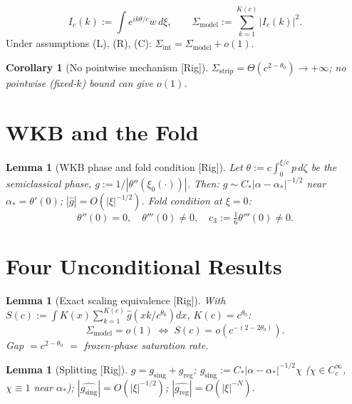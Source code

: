 \documentclass[12pt,a4paper]{amsart}
\newtheorem{lemma}[theorem]{Lemma}
\newtheorem{corollary}[theorem]{Corollary}
\theoremstyle{definition}
\theoremstyle{remark}
\newcommand{\gsing}{g_{\mathrm{sing}}}
\newcommand{\greg}{g_{\mathrm{reg}}}
\newcommand{\Rig}{\textup{[Rig]}}
\begin{document}
\begin{equation}\label{eq:model-def}
  I_c(k):=\int e^{ik\theta/c}
  w\,d\xi,
  \qquad
  \Sigma_{\mathrm{model}}
  :=\textstyle\sum_{k=1}^{K(c)}
  |I_c(k)|^2.
\end{equation}
Under assumptions (L), (R), (C):
$\Sigma_{\mathrm{int}}
=\Sigma_{\mathrm{model}}+o(1)$.

\begin{corollary}[No pointwise
  mechanism \Rig]
\label{cor:S3-negative}
$\Sigma_{\mathrm{strip}}
=\Theta(c^{2-\theta_0})\to+\infty$;
no pointwise (fixed-$k$) bound
can give $o(1)$.
\end{corollary}

\section{WKB and the Fold}
\label{sec:WKB}

\begin{lemma}[WKB phase and
  fold condition \Rig]
\label{lem:WKB-phase}
Let $\theta:=c\int_0^{\xi/c}p\,d\zeta$
be the semiclassical phase,
$g:=1/|\theta''(\xi_0(\cdot))|$.
Then:
$g\sim C_*|\alpha-\alpha_*|^{-1/2}$
near $\alpha_*=\theta'(0)$;
$|\widehat{g}|=O(|\xi|^{-1/2})$.
Fold condition at $\xi=0$:
\begin{equation}\label{eq:fold}
  \theta''(0)=0,
  \quad
  \theta'''(0)\ne 0,
  \quad
  c_3:=\tfrac{1}{6}\theta'''(0)\ne 0.
\end{equation}
\end{lemma}

\section{Four Unconditional Results}
\label{sec:main}

\begin{lemma}[Exact scaling
  equivalence \Rig]
\label{lem:S-equivalence}
With $S(c):=\int K(x)
\sum_{k=1}^{K(c)}
\widehat{g}(xk/c^{\theta_0})dx$,
$K(c)=c^{\theta_0}$:
\begin{equation}\label{eq:exact-equiv}
  \boxed{\Sigma_{\mathrm{model}}=o(1)
  \;\iff\;
  S(c)=o(c^{-(2-2\theta_0)}).}
\end{equation}
Gap $=c^{2-\theta_0}$
$=$ frozen-phase saturation rate.
\end{lemma}

\begin{lemma}[Splitting \Rig]
\label{lem:g-split}
$g=\gsing+\greg$;
$\gsing:=C_*|\alpha-\alpha_*|^{-1/2}\chi$
($\chi\in C^\infty_c$,
$\chi\equiv 1$ near $\alpha_*$);
$|\widehat{\gsing}|=O(|\xi|^{-1/2})$;
$|\widehat{\greg}|=O(|\xi|^{-N})$.
\end{lemma}
\end{document}
